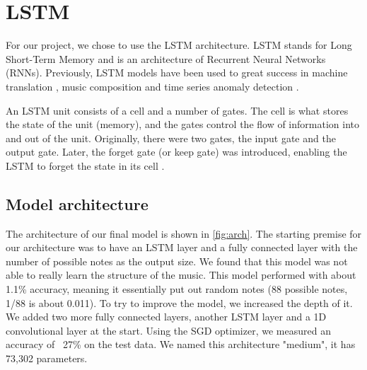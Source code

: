 \documentclass[11pt, twocolumn]{article}
\begin{document}
\section{LSTM}
For our project, we chose to use the LSTM architecture. LSTM stands for Long Short-Term Memory and is an architecture of Recurrent Neural Networks (RNNs). Previously, LSTM models have been used to great success in machine translation \cite{googleLSTMtranslation}, music composition \cite{Eck02learningthe} and time series anomaly detection \cite{malhotra2015long}.

An LSTM unit consists of a cell and a number of gates. The cell is what stores the state of the unit (memory), and the gates control the flow of information into and out of the unit. Originally, there were two gates, the input gate and the output gate. Later, the forget gate (or keep gate) was introduced, enabling the LSTM to forget the state in its cell \cite{LSTMSearchSpaceOdyssey}.

\subsection{Model architecture}\label{architecture}
The architecture of our final model is shown in \autoref{fig:arch}. The starting premise for our architecture was to have an LSTM layer and a fully connected layer with the number of possible notes as the output size. We found that this model was not able to really learn the structure of the music. This model performed with about 1.1\% accuracy, meaning it essentially put out random notes (88 possible notes, 1/88 is about 0.011). To try to improve the model, we increased the depth of it. We added two more fully connected layers, another LSTM layer and a 1D convolutional layer at the start. Using the SGD optimizer, we measured an accuracy of ~27\% on the test data. We named this architecture "medium", it has 73,302 parameters.
\end{document}
